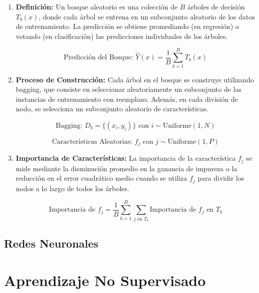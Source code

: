 \documentclass{book}
\begin{document}
\begin{enumerate}
    \item \textbf{Definición:}
        Un bosque aleatorio es una colección de \(B\) árboles de decisión \(T_b(x)\), donde cada árbol se entrena en un subconjunto aleatorio de los datos de entrenamiento. La predicción se obtiene promediando (en regresión) o votando (en clasificación) las predicciones individuales de los árboles.

        \[ \textrm{Predicción del Bosque: } \hat{Y}(x) = \frac{1}{B} \sum_{b=1}^{B} T_b(x) \]

    \item \textbf{Proceso de Construcción:}
        Cada árbol en el bosque se construye utilizando bagging, que consiste en seleccionar aleatoriamente un subconjunto de las instancias de entrenamiento con reemplazo. Además, en cada división de nodo, se selecciona un subconjunto aleatorio de características.

        \[ \textrm{Bagging: } D_b = \{(x_i, y_i)\} \textrm{ con } i \sim \textrm{Uniforme}(1, N) \]

        \[ \textrm{Características Aleatorias: } f_j \textrm{ con } j \sim \textrm{Uniforme}(1, P) \]

    \item \textbf{Importancia de Características:}
        La importancia de la característica \(f_j\) se mide mediante la disminución promedio en la ganancia de impureza o la reducción en el error cuadrático medio cuando se utiliza \(f_j\) para dividir los nodos a lo largo de todos los árboles.

        \[ \textrm{Importancia de } f_j = \frac{1}{B} \sum_{b=1}^{B} \sum_{j \textrm{ en } T_b} \textrm{Importancia de } f_j \textrm{ en } T_b \]

\end{enumerate}    
    
\newpage
\subsection{Redes Neuronales}
\newpage
\section{Aprendizaje No Supervisado}

\end{document}
